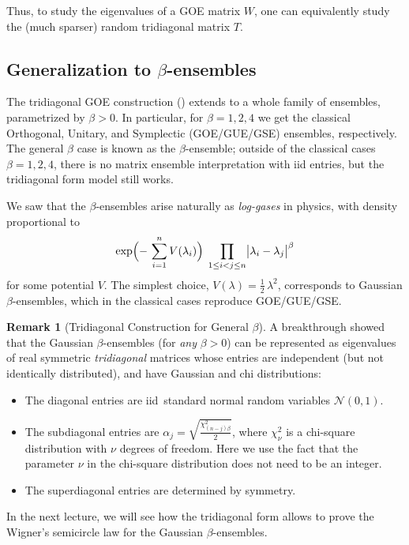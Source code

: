 \documentclass[letterpaper,11pt,oneside,reqno]{book}
\numberwithin{equation}{chapter}  %
\theoremstyle{definition}
\newtheorem{remark}[proposition]{Remark}
\begin{document}
Thus, to study the eigenvalues of a GOE matrix \(W\), one can equivalently study the (much sparser) random tridiagonal matrix \(T\).

\subsection{Generalization to \(\beta\)-ensembles}

The tridiagonal GOE construction ()
extends to a whole family of ensembles, parametrized by
\(\beta>0\).  In particular, for \(\beta = 1, 2, 4\) we get
the classical Orthogonal, Unitary, and Symplectic
(GOE/GUE/GSE) ensembles, respectively.  The general
$\beta$ case is known as the \(\beta\)-ensemble;
outside of the classical cases $\beta=1,2,4$, there
is no matrix ensemble interpretation with iid entries,
but the tridiagonal form model still works.

We saw that
the \(\beta\)-ensembles arise naturally as
\emph{log-gases} in physics, with density
proportional to
\[
  \exp\Bigl(-\,\sum_{i=1}^n V(\lambda_i)\Bigr)
  \;\prod_{1\le i<j\le n}\bigl|\lambda_i - \lambda_j\bigr|^\beta
\]
for some potential \(V\).  The simplest choice, \(V(\lambda)=\tfrac12\,\lambda^2\), corresponds to Gaussian \(\beta\)-ensembles, which in the classical cases reproduce GOE/GUE/GSE.

\begin{remark}[Tridiagonal Construction for General \(\beta\)]
	A breakthrough \cite{dumitriu2002matrix} showed that the
	Gaussian \(\beta\)-ensembles (for \emph{any} \(\beta>0\))
	can be represented
	as eigenvalues of real symmetric
	\emph{tridiagonal} matrices
	whose entries
	are independent
	(but not identically distributed), and have
	Gaussian and chi distributions:
\begin{itemize}
\item The diagonal entries are iid\
	standard normal random variables $\mathcal{N}(0,1)$.
\item The subdiagonal entries are
	$\alpha_j = \sqrt{\frac{\chi^2_{(n-j)\beta}}{2}}$,
	where $\chi^2_{\nu}$ is a chi-square distribution with $\nu$ degrees of freedom.
	Here we use the fact that the parameter $\nu$ in the chi-square distribution does not need to be an integer.
\item The superdiagonal entries are
	determined by symmetry.
\end{itemize}
\end{remark}

In the next lecture, we will see how the tridiagonal form
allows to prove the Wigner's semicircle law for the
Gaussian \(\beta\)-ensembles.
\end{document}
